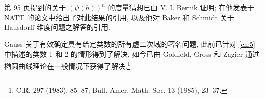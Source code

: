 第 95 页提到的关于 \((\psi(h))^n\) 的度量猜想已由 V. I. Bernik 证明; 在他发表于 NATT 的论文中给出了对此结果的引用, 以及他对 Baker 和 Schmidt 关于 Hausdorff 维度问题之解答的引用.

Gauss 关于有效确定具有给定类数的所有虚二次域的著名问题, 此前已针对 \autoref{ch:5} 中描述的类数 1 和 2 的情形得到了解决, 如今已由 Goldfeld, Gross 和 Zagier 通过椭圆曲线理论在一般情况下获得了解决.\footnote{C.R. 297 (1983), 85--87; Bull. Amer. Math. Soc. 13 (1985), 23--37.}

